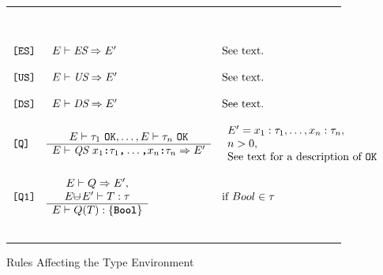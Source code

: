 \documentclass[12pt]{article} %
\newcommand{\reserved}[1]{\textbf{\texttt{#1}}} %
\newcommand{\RULELAB}[1]{\texttt{#1}}
\newcommand{\uminus}{\mbox{$\cup\!\!\!\!-$}}
\newcommand{\UNSPACEFORBOX}{\vspace{-2ex}}
\newcommand{\HLINE}{\UNSPACEFORBOX%
\begin{flushleft}\rule{\textwidth}{0.01in}\end{flushleft}%
\UNSPACEFORBOX}
\newenvironment{BFIGURE}{

\begin{figure}
\small
\HLINE
}{
\HLINE
\normalsize
\end{figure}
}
\begin{document}
\begin{BFIGURE}
\begin{displaymath}
\begin{array}{lll}
\\
~\\
\RULELAB{[ES]} &
\begin{array}{c}
E \vdash \mbox{\it ES} \Rightarrow E'
\end{array}
& \mbox{See text.}\\
~\\
\RULELAB{[US]} &
\begin{array}{c}
E \vdash \mbox{\it US} \Rightarrow E'
\end{array}
& \mbox{See text.}
\\
~\\
\RULELAB{[DS]} &
\begin{array}{c}
E \vdash \mbox{\it DS} \Rightarrow E'
\end{array}
& \mbox{See text.}
\\
~\\
\RULELAB{[Q]} &
\begin{array}{c}
E \vdash \tau_1~\mbox{\tt OK},\dots,E \vdash \tau_n~\mbox{\tt OK} \\
\hline
E \vdash \mbox{\it QS }
x_1\mbox{\reserved{:}}\tau_1\mbox{\reserved{,}}
\dots\mbox{\reserved{,}} x_n\mbox{\reserved{:}}\tau_n \Rightarrow E'
\end{array}
&
\begin{array}{l}
E' = x _1:\tau _1,\dots,x _n:\tau_n, \\
n>0, \\
\mbox{See text for a description of \tt OK}
\end{array}
\\
~\\
\RULELAB{[Q1]} &
\begin{array}{c}
E \vdash Q \Rightarrow E', \\
E \uminus E' \vdash T:\tau \\
\hline
E \vdash Q(T):\{\reserved{Bool}\}
\end{array}
&
\mbox{if $Bool \in \tau$}
\\
~\\
\end{array}
\end{displaymath}
\caption{Rules Affecting the Type Environment}
\label{xxxxx}
\end{BFIGURE}
\end{document}
